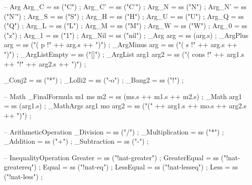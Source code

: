\begin{lstgf}
{        -- Arg
        Arg_C                           = ss ("C") ;
        Arg_C'                          = ss ("C'") ;
        Arg_N                           = ss ("N") ;
        Arg_N'                          = ss ("N'") ;
        Arg_S                           = ss ("S") ;
        Arg_H                           = ss ("H") ;
        Arg_U                           = ss ("U") ;
        Arg_Q                           = ss ("Q") ;
        Arg_L                           = ss ("L") ;
        Arg_M                           = ss ("M") ;
        Arg_W                           = ss ("W") ;
        Arg_0                           = ss ("z") ;
        Arg_1                           = ss ("1") ;
        Arg_Nil                         = ss ("nil") ;
        _Arg arg                        = ss (arg.s) ;
        _ArgPlus arg                    = ss ("( p !" ++ arg.s ++ ")") ;
        _ArgMinus arg                   = ss ("( s !" ++ arg.s ++ ")") ;
        _ArgListEmpty                   = ss ("[]") ;
        _ArgList arg1 arg2              = ss ("( cons !" ++ arg1.s ++ "!" ++ arg2.s ++ ")") ;
        
        _Conj2                          = ss ("*") ;
        _Lolli2                         = ss ("-o") ;
        _Bang2                          = ss ("!") ;

        -- Math
        _FinalFormula m1 ms m2          = ss (ms.s ++ m1.s ++ m2.s) ;
        _Math arg1                      = ss (arg1.s) ;
        _MathArgs arg1 mo arg2          = ss ("(" ++ arg1.s ++ mo.s ++ arg2.s ++ ")") ;

        -- ArithmeticOperation
        _Division                       = ss ("/") ;
        _Multiplication                 = ss ("*") ;
        _Addition                       = ss ("+") ;
        _Subtraction                    = ss ("-") ;

        -- InequalityOperation
        Greater                         = ss ("!nat-greater") ;
        GreaterEqual                    = ss ("!nat-greatereq") ;
        Equal                           = ss ("!nat-eq") ;
        LessEqual                       = ss ("!nat-lesseq") ;
        Less                            = ss ("!nat-less") ;
}
\end{lstgf}